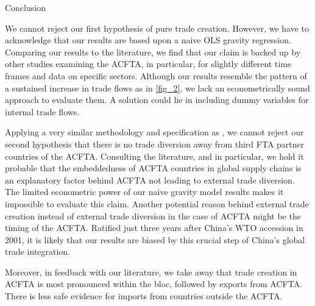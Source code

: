\begin{section}{Conclusion}

We cannot reject our first hypothesis of pure trade creation. However, we have to acknowledge that our results are based upon a naive OLS gravity regression. Comparing our results to the literature, we find that our claim is backed up by other studies examining the ACFTA, in particular, for slightly different time frames and data on specific sectors. Although our results resemble the pattern of a sustained increase in trade flows as in \autoref{fig_2}, we lack an econometrically sound approach to evaluate them. A solution could lie in including dummy variables for internal trade flows.

Applying a very similar methodology and specification as \cite{dyz_2014}, we cannot reject our second hypothesis that there is no trade diversion away from third FTA partner countries of the ACFTA. Consulting the literature, and \cite{wla_2021} in particular, we hold it probable that the embeddedness of ACFTA countries in global supply chains is an explanatory factor behind ACFTA not leading to external trade diversion. The limited econometric power of our naive gravity model results makes it impossible to evaluate this claim. Another potential reason behind external trade creation instead of external trade diversion in the case of ACFTA might be the timing of the ACFTA. Ratified just three years after China's WTO accession in 2001, it is likely that our results are biased by this crucial step of China's global trade integration.

Moreover, in feedback with our literature, we take away that trade creation in ACFTA is most pronounced within the bloc, followed by exports from ACFTA. There is less safe evidence for imports from countries outside the ACFTA.

\end{section}